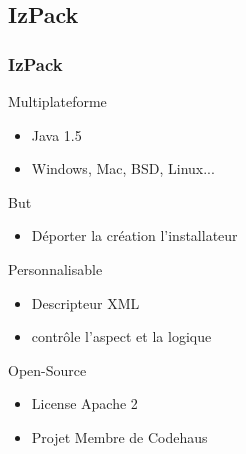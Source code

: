\subsection{IzPack}
\begin{frame}\frametitle{IzPack}
\begin{minipage}[c]{.46\linewidth}
	\begin{beamerboxesrounded}[shadow=true]{Multiplateforme}
		\begin{itemize}
		\item Java 1.5
		\item Windows, Mac, BSD, Linux...
		\end{itemize}
	\end{beamerboxesrounded}
\end{minipage}
\hfill
\begin{minipage}[c]{.46\linewidth}
	\begin{beamerboxesrounded}[shadow=true]{But}
		\begin{itemize}
		\item Déporter la création l'installateur
		\end{itemize}
	\end{beamerboxesrounded}
\end{minipage}
\vfill
\begin{minipage}[c]{.46\linewidth}
	\begin{beamerboxesrounded}[shadow=true]{Personnalisable}
		\begin{itemize}
		\item Descripteur XML 
		\item contrôle l'aspect et la logique
		\end{itemize}
	\end{beamerboxesrounded}
\end{minipage}
\hfill
\begin{minipage}[c]{.46\linewidth}
	\begin{beamerboxesrounded}[shadow=true]{Open-Source}
		\begin{itemize}
		\item License Apache 2
		\item Projet Membre de Codehaus
		\end{itemize}
	\end{beamerboxesrounded}
\end{minipage}
\end{frame}
